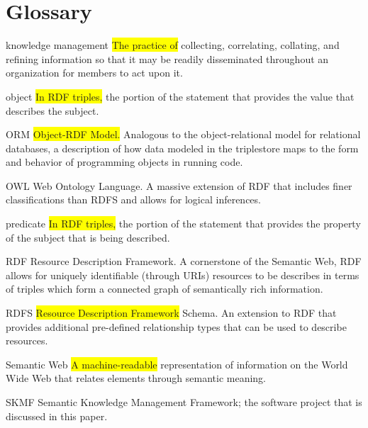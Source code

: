 %
%
\chapter*{Glossary}      %
\thispagestyle{plain}

\begin{glossary}

\item[knowledge management] \colorbox{yellow}{The practice of} collecting, correlating, collating, and refining information so that it may be readily disseminated throughout an organization for members to act upon it.

\item[object] \colorbox{yellow}{In RDF triples,} the portion of the statement that provides the value that describes the subject.

\item[ORM] \colorbox{yellow}{Object-RDF Model.} Analogous to the object-relational model for relational databases, a description of how data modeled in the triplestore maps to the form and behavior of programming objects in running code.

\item[OWL] Web Ontology Language. A massive extension of RDF that includes finer classifications than RDFS and allows for logical inferences.

\item[predicate] \colorbox{yellow}{In RDF triples,} the portion of the statement that provides the property of the subject that is being described.

\item[RDF] Resource Description Framework. A cornerstone of the Semantic Web, RDF allows for uniquely identifiable (through URIs) resources to be describes in terms of triples which form a connected graph of semantically rich information.

\item[RDFS] \colorbox{yellow}{Resource Description Framework} Schema. An extension to RDF that provides additional pre-defined relationship types that can be used to describe resources.

\item[Semantic Web] \colorbox{yellow}{A machine-readable} representation of information on the World Wide Web that relates elements through semantic meaning.

\item[SKMF] Semantic Knowledge Management Framework; the software project that is discussed in this paper.


\end{glossary}
